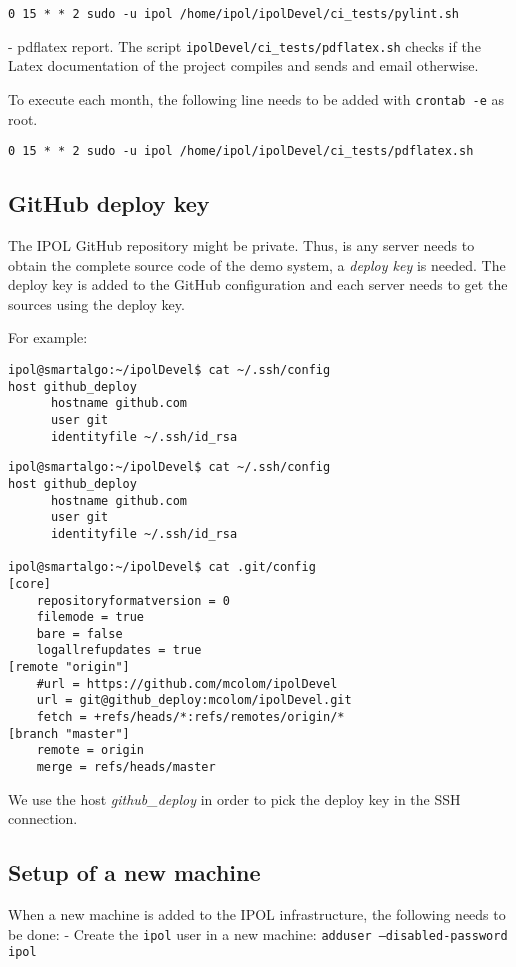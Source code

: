 \documentclass[a4paper,12pt]{article}
\begin{document}
{\tt 0 15 * * 2 sudo -u ipol /home/ipol/ipolDevel/ci\_tests/pylint.sh}

- pdflatex report. The script {\tt ipolDevel/ci\_tests/pdflatex.sh} checks if the Latex documentation of the project compiles and sends and email otherwise.

To execute each month, the following line needs to be added with {\tt crontab -e} as root.

{\tt 0 15 * * 2 sudo -u ipol /home/ipol/ipolDevel/ci\_tests/pdflatex.sh}



\subsection{GitHub deploy key}
The IPOL GitHub repository might be private. Thus, is any server needs to obtain the complete source code of the demo system, a \emph{deploy key} is needed. The deploy key is added to the GitHub configuration and each server needs to get the sources using the deploy key.

For example:

\begin{verbatim}
ipol@smartalgo:~/ipolDevel$ cat ~/.ssh/config 
host github_deploy
      hostname github.com
      user git
      identityfile ~/.ssh/id_rsa
\end{verbatim}

\vspace{0.15cm}

\begin{verbatim}
ipol@smartalgo:~/ipolDevel$ cat ~/.ssh/config 
host github_deploy
      hostname github.com
      user git
      identityfile ~/.ssh/id_rsa

ipol@smartalgo:~/ipolDevel$ cat .git/config 
[core]
	repositoryformatversion = 0
	filemode = true
	bare = false
	logallrefupdates = true
[remote "origin"]
	#url = https://github.com/mcolom/ipolDevel
	url = git@github_deploy:mcolom/ipolDevel.git
	fetch = +refs/heads/*:refs/remotes/origin/*
[branch "master"]
	remote = origin
	merge = refs/heads/master
\end{verbatim}

We use the host \emph{github\_deploy} in order to pick the deploy key in the SSH connection.

\subsection{Setup of a new machine}
When a new machine is added to the IPOL infrastructure, the following needs to be done:
- Create the {\tt ipol} user in a new machine: {\tt adduser --disabled-password ipol}
\end{document}
